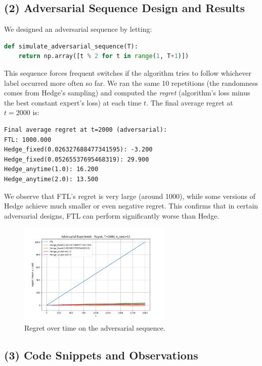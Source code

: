 \subsection{(2) Adversarial Sequence Design and Results}

We designed an adversarial sequence by letting:
\begin{lstlisting}[language=Python, caption={Adversarial sequence alternating 0 and 1.}] 
def simulate_adversarial_sequence(T): 
    return np.array([t % 2 for t in range(1, T+1)]) 
\end{lstlisting} 

This sequence forces frequent switches if the algorithm tries to follow whichever label occurred more often so far. We ran the same 10 repetitions (the randomness comes from Hedge’s sampling) and computed the \emph{regret} (algorithm’s loss minus the best constant expert’s loss) at each time $t$. The final average regret at $t=2000$ is:

\begin{verbatim} 
Final average regret at t=2000 (adversarial): 
FTL: 1000.000 
Hedge_fixed(0.026327688477341595): -3.200 
Hedge_fixed(0.05265537695468319): 29.900 
Hedge_anytime(1.0): 16.200 
Hedge_anytime(2.0): 13.500 
\end{verbatim}

We observe that FTL’s regret is very large (around 1000), while some versions of Hedge achieve much smaller or even negative regret. This confirms that in certain adversarial designs, FTL can perform significantly worse than Hedge.

\begin{figure}[h!] 
    \centering 
    \includegraphics[width=0.65\textwidth]{Code/Figure_4_adversarial.png}
    \caption{Regret over time on the adversarial sequence.} 
    \label{fig:plots_adversarial} 
\end{figure}

\subsection{(3) Code Snippets and Observations}

